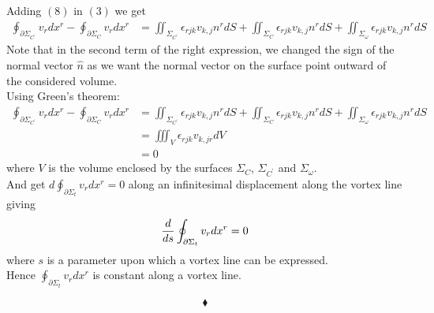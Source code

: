 Adding $(8)$ in $(3)$ we get 
\begin{align}
\oint_{\partial\Sigma_{C^{'}}} {v_rdx^r }-\oint_{\partial\Sigma_{C}} v_rdx^r&= \iint_{\Sigma_{C^{'}}}\epsilon_{rjk}v_{k,j}n^rdS+\iint_{\Sigma_{C}}\epsilon_{rjk}v_{k,j}n^rdS+\iint_{\Sigma_{\omega}}\epsilon_{rjk}v_{k,j}n^rdS
\end{align}
Note that in the second term of the right expression, we changed the sign of the normal vector $\hat{n}$ as we want the normal vector on the surface point outward of the considered volume.\\
Using Green's theorem:
\begin{align}
\oint_{\partial\Sigma_{C^{'}}} {v_rdx^r }-\oint_{\partial\Sigma_{C}} v_rdx^r&= \iint_{\Sigma_{C^{'}}}\epsilon_{rjk}v_{k,j}n^rdS+\iint_{\Sigma_{C}}\epsilon_{rjk}v_{k,j}n^rdS+\iint_{\Sigma_{\omega}}\epsilon_{rjk}v_{k,j}n^rdS\\
 &= \iiint_V \epsilon_{rjk}v_{k,jr}dV\\
 &=0
\end{align}
where $V$ is the volume enclosed by the surfaces $\Sigma_{C}$, $\Sigma_{C^{'}}$ and $\Sigma_{\omega}$.\\
And get $d\oint_{\partial\Sigma_{t}} v_rdx^r=0$ along  an infinitesimal displacement along the vortex line  giving 
$$\dv{}{s}\oint_{\partial\Sigma_{t}} v_rdx^r=0$$ where $s$ is a parameter upon which a vortex line can be expressed. \\
Hence $\oint_{\partial\Sigma_{t}} v_rdx^r$ is constant along a vortex line.

 $$\blacklozenge$$
\newpage




